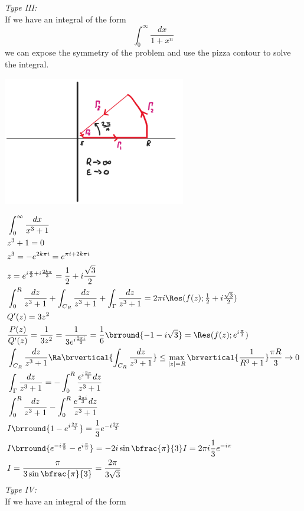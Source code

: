 \textit{Type III:}\\
If we have an integral of the form
\[\int_0^\infty\frac{dx}{1+x^n}\]
we can expose the symmetry of the problem and use the pizza contour to solve the integral.\\
\centerline{\includegraphics[width=0.6\textwidth]{Images/ComplexAnalysisPictures/Pizza.png}}
\begin{align*}
    &\int_0^\infty\frac{dx}{x^3+1}\\
    &z^3+1=0\\
    &z^3=-e^{2k\pi i}=e^{\pi i+2k\pi i}\\
    &z=e^{i\frac{\pi}{3}+i\frac{2k\pi}{3}}=\frac{1}{2}+i\frac{\sqrt{3}}{2}\\
    &\int_0^R\frac{dz}{z^3+1}+\int_{C_R}\frac{dz}{z^3+1}+\int_{\Gamma}\frac{dz}{z^3+1}=2\pi i\Res(f(z);\tfrac{1}{2}+i\tfrac{\sqrt{3}}{2})\\
    &Q'(z)=3z^2\\
    &\frac{P(z)}{Q'(z)}=\frac{1}{3z^2}=\frac{1}{3e^{i\frac{2\pi i}{3}}}=\frac{1}{6}\brround{-1-i\sqrt{3}}=\Res(f(z);e^{i\frac{\pi}{3}})\\
    &\int_{C_R}\frac{dz}{z^3+1}\Ra \brvertical{\int_{C_R}\frac{dz}{z^3+1}}\leq\max_{|z|=R}\brvertical{\frac{1}{R^3+1}}\frac{\pi R}{3}\to0\\
    &\int_{\Gamma}\frac{dz}{z^3+1}=-\int_0^R\frac{e^{i\frac{2\pi}{3}}dz}{z^3+1}\\
    &\int_0^R\frac{dz}{z^3+1}-\int_0^R\frac{e^{\frac{2\pi i}{3}}dz}{z^3+1}\\
    &I\brround{1-e^{i\frac{2\pi}{3}}}=\frac{1}{3}e^{-i\frac{2\pi}{3}}\\
    &I\brround{e^{-i\frac{\pi}{3}}-e^{i\frac{\pi}{3}}}=-2i\sin\bfrac{\pi}{3}I=2\pi i\frac{1}{3}e^{-i\pi}\\
    &I=\frac{\pi}{3\sin\bfrac{\pi}{3}}=\frac{2\pi}{3\sqrt{3}}
\end{align*}
\textit{Type IV:}\\
If we have an integral of the form
